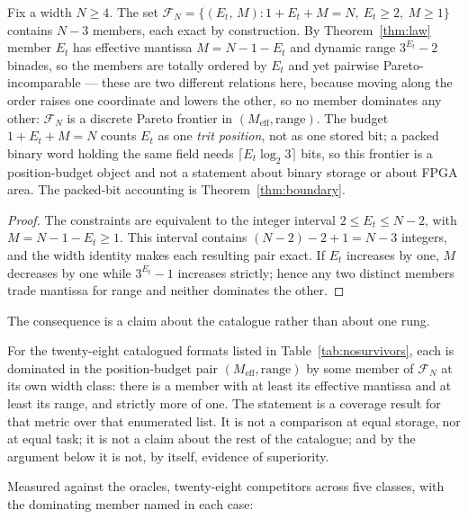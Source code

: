 \begin{theorem}
\label{thm:family}
Fix a width $N\geq4$. The set
$\mathcal{F}_N = \{(E_t,\, M) : 1 + E_t + M = N,\ E_t \geq 2,\ M \geq 1\}$
contains $N-3$ members, each exact by construction. By
Theorem~\ref{thm:law} member $E_t$ has effective mantissa $M = N-1-E_t$ and
dynamic range $3^{E_t}-2$ binades, so the members are totally ordered by $E_t$ and
yet pairwise Pareto-incomparable --- these are two different relations here, because
moving along the order raises one coordinate and lowers the other, so no member
dominates any other: $\mathcal{F}_N$ is a discrete Pareto frontier in
$(M_{\mathrm{eff}}, \text{range})$. The budget $1+E_t+M=N$ counts $E_t$ as one
\emph{trit position}, not as one stored bit; a packed binary word holding the
same field needs $\lceil E_t\log_2 3\rceil$ bits, so this frontier is a
position-budget object and not a statement about binary storage or about FPGA
area. The packed-bit accounting is Theorem~\ref{thm:boundary}.
\end{theorem}
\begin{proof}
The constraints are equivalent to the integer interval
$2\leq E_t\leq N-2$, with $M=N-1-E_t\geq1$. This interval contains
$(N-2)-2+1=N-3$ integers, and the width identity makes each resulting pair
exact. If $E_t$ increases by one, $M$ decreases by one while
$3^{E_t}-1$ increases strictly; hence any two distinct members trade mantissa
for range and neither dominates the other.
\end{proof}

The consequence is a claim about the catalogue rather than about one rung.

\sloppy
\begin{corollary}
\label{cor:nosurvivors}
For the twenty-eight catalogued formats listed in
Table~\ref{tab:nosurvivors}, each is dominated in the position-budget pair
$(M_{\mathrm{eff}}, \text{range})$ by some member of $\mathcal{F}_N$ at its own
width class: there is a member with at least its effective mantissa and at least
its range, and strictly more of one. The statement is a coverage result for that
metric over that enumerated list. It is not a comparison at equal storage, nor
at equal task; it is not a claim about the rest of the catalogue; and by the
argument below it is not, by itself, evidence of superiority.
\end{corollary}
\fussy

Measured against the oracles, twenty-eight competitors across five classes, with
the dominating member named in each case:

